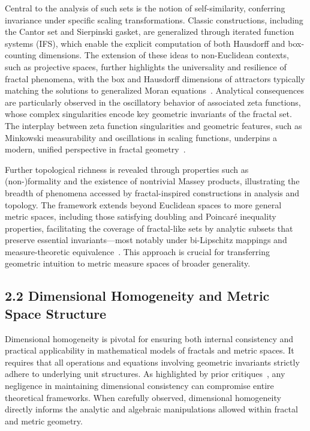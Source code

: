 \documentclass[11pt]{article}
\begin{document}
Central to the analysis of such sets is the notion of self-similarity, conferring invariance under specific scaling transformations. Classic constructions, including the Cantor set and Sierpinski gasket, are generalized through iterated function systems (IFS), which enable the explicit computation of both Hausdorff and box-counting dimensions. The extension of these ideas to non-Euclidean contexts, such as projective spaces, further highlights the universality and resilience of fractal phenomena, with the box and Hausdorff dimensions of attractors typically matching the solutions to generalized Moran equations~\cite{ref24,ref33}. Analytical consequences are particularly observed in the oscillatory behavior of associated zeta functions, whose complex singularities encode key geometric invariants of the fractal set. The interplay between zeta function singularities and geometric features, such as Minkowski measurability and oscillations in scaling functions, underpins a modern, unified perspective in fractal geometry~\cite{ref21,ref23,ref33}.

Further topological richness is revealed through properties such as (non-)formality and the existence of nontrivial Massey products, illustrating the breadth of phenomena accessed by fractal-inspired constructions in analysis and topology. The framework extends beyond Euclidean spaces to more general metric spaces, including those satisfying doubling and Poincaré inequality properties, facilitating the coverage of fractal-like sets by analytic subsets that preserve essential invariants—most notably under bi-Lipschitz mappings and measure-theoretic equivalence~\cite{ref23,ref93,ref6}. This approach is crucial for transferring geometric intuition to metric measure spaces of broader generality.

\subsection{2.2 Dimensional Homogeneity and Metric Space Structure}

Dimensional homogeneity is pivotal for ensuring both internal consistency and practical applicability in mathematical models of fractals and metric spaces. It requires that all operations and equations involving geometric invariants strictly adhere to underlying unit structures. As highlighted by prior critiques~\cite{ref61}, any negligence in maintaining dimensional consistency can compromise entire theoretical frameworks. When carefully observed, dimensional homogeneity directly informs the analytic and algebraic manipulations allowed within fractal and metric geometry.
\end{document}
